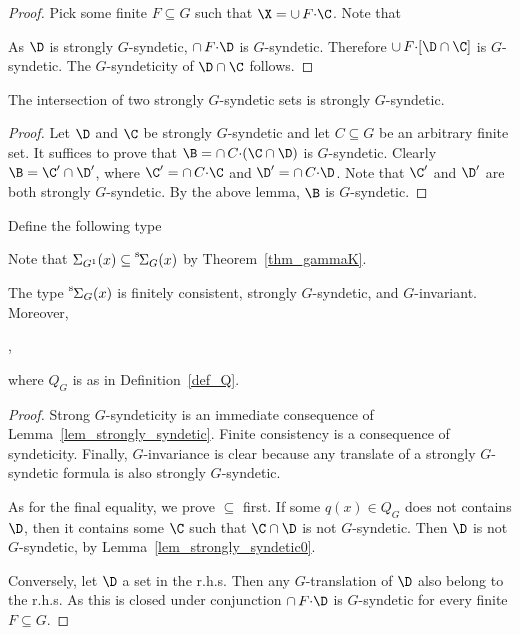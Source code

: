 \begin{proof}
  Pick some finite $F\subseteq G$ such that $\X=\cup\,F{\cdot}\C$.
  Note that
  
  
  
  As $\D$ is strongly $G$-syndetic, $\cap\,F{\cdot}\D$ is $G$-syn\-detic.
  Therefore $\cup\,F{\cdot}[\D\cap\C]$ is $G$-syndetic.
  The $G$-syndeticity of $\D\cap\C$ follows.
\end{proof}

\begin{lemma}\label{lem_strongly_syndetic}
  The intersection of two strongly $G$-syndetic sets is strongly $G$-syndetic.
\end{lemma}

\begin{proof}
  Let $\D$ and $\C$ be strongly $G$-syndetic and let $C\subseteq G$ be an arbitrary finite set.
  It suffices to prove that $\B=\cap\, C{\cdot}(\C\cap\D)$ is $G$-syndetic. 
  Clearly $\B=\C'\cap\D'$, where $\C'=\cap\, C{\cdot}\C$ and $\D'=\cap\, C{\cdot}\D$.
  Note that $\C'$ and $\D'$ are both strongly $G$-syndetic.
  By the above lemma, $\B$ is $G$-syndetic.
\end{proof}

Define the following type

\smallskip

Note that $\Sigma_{G^1}(x)\subseteq{\mathstrut}^{\rm s}\kern-.2ex\Sigma_G(x)$ by Theorem~\ref{thm_gammaK}.

\begin{corollary}\label{corol_str_gen}
  The type ${\mathstrut}^{\rm s}\kern-.1ex\Sigma_G(x)$ is finitely consistent, strongly $G$-syn\-detic, and $G$-invariant.
  Moreover, \smallskip

  ,\smallskip
 
  where $Q_G$ is as in Definition~\ref{def_Q}.
\end{corollary}

\begin{proof}
  Strong $G$-syndeticity is an immediate consequence of Lemma~\ref{lem_strongly_syndetic}.
  Finite consistency is a consequence of syndeticity.
  Finally, $G$-invariance is clear because any translate of a strongly $G$-syndetic formula is also strongly $G$-syndetic.

  As for the final equality, we prove $\subseteq$ first.
  If some $q(x)\in Q_G$ does not contains $\D$, then it contains some $\C$ such that $\C\cap\D$ is not $G$-syndetic.
  Then $\D$ is not $G$-syndetic, by Lemma~\ref{lem_strongly_syndetic0}.

  Conversely, let $\D$ a set in the r.h.s.
  Then any $G$-translation of $\D$ also belong to the r.h.s.
  As this is closed under conjunction $\cap\,F{\cdot}\D$ is $G$-syndetic for every finite $F\subseteq G$. 
\end{proof}

